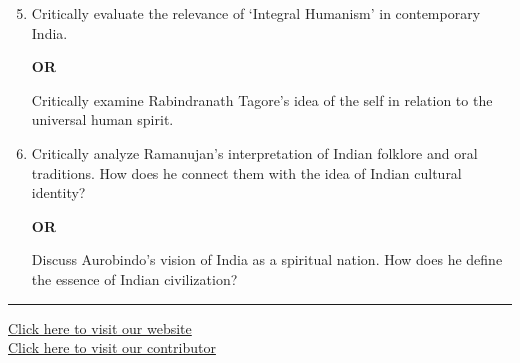 \documentclass[11pt,a4paper]{article}
\begin{document}
\begin{enumerate}[label=   \textbf{\arabic*.}]
    \setcounter{enumi}{4}
    \item Critically evaluate the relevance of `Integral Humanism' in contemporary India.
    
    
\begin{center}   \textbf{OR}\end{center}

    Critically examine Rabindranath Tagore's idea of the self in relation to the universal human spirit.

    \item Critically analyze Ramanujan's interpretation of Indian folklore and oral traditions. How does he connect them with the idea of Indian cultural identity?
    
    
\begin{center}   \textbf{OR}\end{center}

    Discuss Aurobindo's vision of India as a spiritual nation. How does he define the essence of Indian civilization?
\end{enumerate}

\vfill
\rule{\linewidth}{0.4pt}

\begin{center}\small
\href{https://bhu-exam.vercel.app/}{Click here to visit our website}\\[4pt]
\href{https://me-aryan.vercel.app/}{Click here to visit our contributor}
\end{center}
\end{document}
